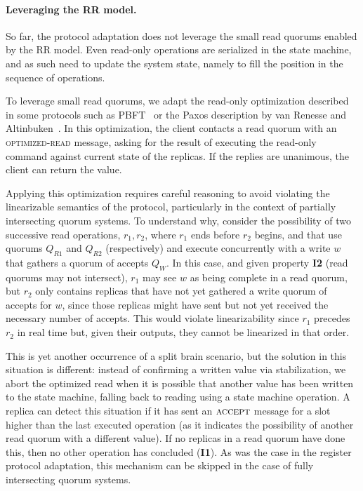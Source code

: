 \paragraph{Leveraging the \ac{RR} model.}
So far, the protocol adaptation does not leverage the
small read quorums enabled by the \ac{RR} model. Even
read-only operations are serialized in the state machine, and as
such need to update the system state, namely to fill the position
in the sequence of operations.

To leverage small read quorums, we adapt the read-only
optimization described in some protocols such as PBFT~\cite{pbft} or
the Paxos description by van Renesse and Altinbuken~\cite{pmmc}.  In
this optimization, the client contacts a read quorum with an
\textsc{optimized-read} message, asking for the
result of executing the read-only command against current state of the
replicas. If the replies are unanimous, the client can return the
value.

Applying this optimization requires careful reasoning to avoid
violating the linearizable semantics of the protocol,
particularly in the context of partially intersecting quorum
systems. To understand why, consider the possibility of two
successive read operations, $r_1, r_2$, where $r_1$ ends before
$r_2$ begins, and that use quorums $Q_{R1}$ and $Q_{R2}$
(respectively) and execute concurrently with a write $w$ that
gathers a quorum of accepts $Q_W$. In this case, and given
property \textbf{I2} (read quorums may not intersect), $r_1$ may
see $w$ as being complete in a read quorum, but $r_2$ only
contains replicas that have not yet gathered a write quorum of
accepts for $w$, since those replicas might have sent but not yet
received the necessary number of accepts. This would violate
linearizability since $r_1$ precedes $r_2$ in real time but,
given their outputs, they cannot be linearized in that order.

This is yet another occurrence of a split brain scenario, but
the solution in this situation is different: instead of
confirming a written value via stabilization, we abort the
optimized read when it is possible that another value has been
written to the state machine, falling back to reading using a
state machine operation. A replica can detect this situation if
it has sent an $\textsc{accept}$ message for a slot
higher than the last executed operation (as it indicates the
possibility of another read quorum with a different value). If no
replicas in a read quorum have done this, then no other operation
has concluded (\textbf{I1}). As was the case in the register
protocol adaptation, this mechanism can be skipped in the case of
fully intersecting quorum systems.


